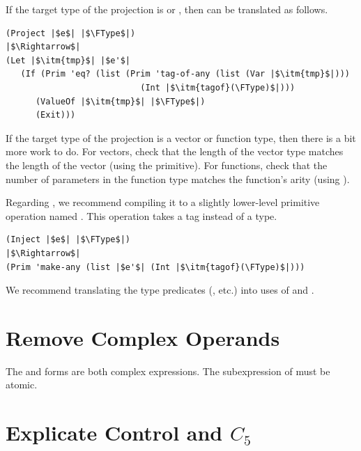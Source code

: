 \documentclass[11pt]{book}
\begin{document}
If the target type of the projection is  or
, then  can be translated as follows.
\begin{center}
\begin{minipage}{1.0\textwidth}
\begin{lstlisting}
(Project |$e$| |$\FType$|)
|$\Rightarrow$|
(Let |$\itm{tmp}$| |$e'$|
   (If (Prim 'eq? (list (Prim 'tag-of-any (list (Var |$\itm{tmp}$|)))
                           (Int |$\itm{tagof}(\FType)$|)))
      (ValueOf |$\itm{tmp}$| |$\FType$|)
      (Exit)))
\end{lstlisting}
\end{minipage}
\end{center}
If the target type of the projection is a vector or function type,
then there is a bit more work to do. For vectors, check that the
length of the vector type matches the length of the vector (using the
 primitive). For functions, check that the number
of parameters in the function type matches the function's arity (using
).

Regarding , we recommend compiling it to a slightly
lower-level primitive operation named . This operation
takes a tag instead of a type. \\
\begin{center}
\begin{minipage}{1.0\textwidth}
\begin{lstlisting}
(Inject |$e$| |$\FType$|)
|$\Rightarrow$|
(Prim 'make-any (list |$e'$| (Int |$\itm{tagof}(\FType)$|)))
\end{lstlisting}
\end{minipage}
\end{center}

We recommend translating the type predicates (, etc.)
into uses of  and .

\section{Remove Complex Operands}
\label{sec:rco-r6}

The  and  forms are both complex expressions.
The subexpression of  must be atomic.

\section{Explicate Control and $C_5$}
\label{sec:explicate-r6}
\end{document}
